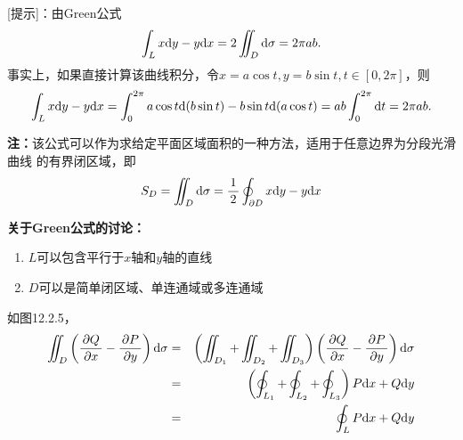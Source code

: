 [提示]：由Green公式
$$\displaystyle\int_Lx\mathrm{d} y-y\mathrm{d} x=2\iint_D\mathrm{d}\sigma=2\pi ab.$$
事实上，如果直接计算该曲线积分，令$x=a\cos t,y=b\sin t,t\in[0,2\pi]$，则
$$\displaystyle\int_Lx\mathrm{d} y-y\mathrm{d} x=\displaystyle\int_0^{2\pi}a\cos t\mathrm{d}(b\sin t)
-b\sin t\mathrm{d}(a\cos t)=ab\displaystyle\int_0^{2\pi}\mathrm{d} t=2\pi ab.$$

{\bf 注：}该公式可以作为求给定平面区域面积的一种方法，适用于任意边界为分段光滑曲线
的有界闭区域，即
$$S_D=\iint_D\mathrm{d}\sigma=\displaystyle\frac{\,{1}\,}{\,{2}\,}\oint_{\partial D}x\mathrm{d} y-y\mathrm{d} x$$

{\bf 关于Green公式的讨论：}
\begin{enumerate}[(1)]
  \setlength{\itemindent}{1cm}
  \item $L$可以包含平行于$x$轴和$y$轴的直线
  \item $D$可以是简单闭区域、单连通域或多连通域
\end{enumerate}

\begin{center}
\end{center}

如图12.2.5，
\begin{eqnarray*}
	\iint_D\left(\displaystyle\frac{\,{\partial Q}\,}{\,{\partial x}\,}-\displaystyle\frac{\,{\partial P}\,}{\,{\partial y}\,}\right)\mathrm{d}\sigma&=&
	\left(\iint_{D_1}+\iint_{D_2}+\iint_{D_3}\right)\left(\displaystyle\frac{\,{\partial Q}\,}{\,{\partial x}\,}-\displaystyle\frac{\,{\partial
	P}\,}{\,{\partial y}\,}\right)\mathrm{d}\sigma\\
	&=&\left(\oint_{L_1}+\oint_{L_2}+\oint_{L_3}\right)P\mathrm{d} x+Q\mathrm{d} y\\
	&=&\oint_LP\mathrm{d} x+Q\mathrm{d} y
\end{eqnarray*}

